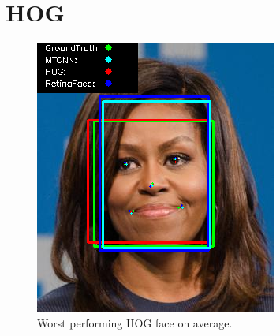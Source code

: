 \documentclass{l4proj}
\begin{document}
\section{HOG}
\begin{figure}[h!]
  \centering
  \begin{minipage}{0.5\textwidth}
    \includegraphics[width=\textwidth]{images/dlib_worst.png}
    \caption{Worst performing HOG face on average.}
    \label{dlib_worst}
  \end{minipage}
  \hfill
  \end{figure}
\end{document}
